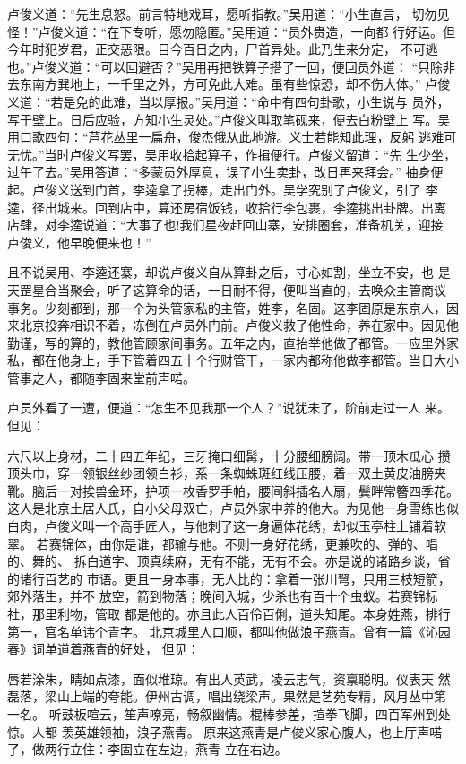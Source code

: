卢俊义道：“先生息怒。前言特地戏耳，愿听指教。”吴用道：“小生直言，
切勿见怪！”卢俊义道：“在下专听，愿勿隐匿。”吴用道：“员外贵造，一向都
行好运。但今年时犯岁君，正交恶限。目今百日之内，尸首异处。此乃生来分定，
不可逃也。”卢俊义道：“可以回避否？”吴用再把铁算子搭了一回，便回员外道：
“只除非去东南方巽地上，一千里之外，方可免此大难。虽有些惊恐，却不伤大体。”
卢俊义道：“若是免的此难，当以厚报。”吴用道：“命中有四句卦歌，小生说与
员外，写于壁上。日后应验，方知小生灵处。”卢俊义叫取笔砚来，便去白粉壁上
写。吴用口歌四句：“芦花丛里一扁舟，俊杰俄从此地游。义士若能知此理，反躬
逃难可无忧。”当时卢俊义写罢，吴用收拾起算子，作揖便行。卢俊义留道：“先
生少坐，过午了去。”吴用答道：“多蒙员外厚意，误了小生卖卦，改日再来拜会。”
抽身便起。卢俊义送到门首，李逵拿了拐棒，走出门外。吴学究别了卢俊义，引了
李逵，径出城来。回到店中，算还房宿饭钱，收拾行李包裹，李逵挑出卦牌。出离
店肆，对李逵说道：“大事了也!我们星夜赶回山寨，安排圈套，准备机关，迎接
卢俊义，他早晚便来也！”

且不说吴用、李逵还寨，却说卢俊义自从算卦之后，寸心如割，坐立不安，也
是天罡星合当聚会，听了这算命的话，一日耐不得，便叫当直的，去唤众主管商议
事务。少刻都到，那一个为头管家私的主管，姓李，名固。这李固原是东京人，因
来北京投奔相识不着，冻倒在卢员外门前。卢俊义救了他性命，养在家中。因见他
勤谨，写的算的，教他管顾家间事务。五年之内，直抬举他做了都管。一应里外家
私，都在他身上，手下管着四五十个行财管干，一家内都称他做李都管。当日大小
管事之人，都随李固来堂前声喏。

卢员外看了一遭，便道：“怎生不见我那一个人？”说犹未了，阶前走过一人
来。但见：

六尺以上身材，二十四五年纪，三牙掩口细髯，十分腰细膀阔。带一顶木瓜心
攒顶头巾，穿一领银丝纱团领白衫，系一条蜘蛛斑红线压腰，着一双土黄皮油膀夹
靴。脑后一对挨兽金环，护项一枚香罗手帕，腰间斜插名人扇，鬓畔常簪四季花。
这人是北京土居人氏，自小父母双亡，卢员外家中养的他大。为见他一身雪练也似
白肉，卢俊义叫一个高手匠人，与他刺了这一身遍体花绣，却似玉亭柱上铺着软翠。
若赛锦体，由你是谁，都输与他。不则一身好花绣，更兼吹的、弹的、唱的、舞的、
拆白道字、顶真续麻，无有不能，无有不会。亦是说的诸路乡谈，省的诸行百艺的
市语。更且一身本事，无人比的：拿着一张川弩，只用三枝短箭，郊外落生，并不
放空，箭到物落；晚间入城，少杀也有百十个虫蚁。若赛锦标社，那里利物，管取
都是他的。亦且此人百伶百俐，道头知尾。本身姓燕，排行第一，官名单讳个青字。
北京城里人口顺，都叫他做浪子燕青。曾有一篇《沁园春》词单道着燕青的好处，
但见：

唇若涂朱，睛如点漆，面似堆琼。有出人英武，凌云志气，资禀聪明。仪表天
然磊落，梁山上端的夸能。伊州古调，唱出绕梁声。果然是艺苑专精，风月丛中第
一名。
听鼓板喧云，笙声嘹亮，畅叙幽情。棍棒参差，揎拳飞脚，四百军州到处惊。人都
羡英雄领袖，浪子燕青。
原来这燕青是卢俊义家心腹人，也上厅声喏了，做两行立住：李固立在左边，燕青
立在右边。

